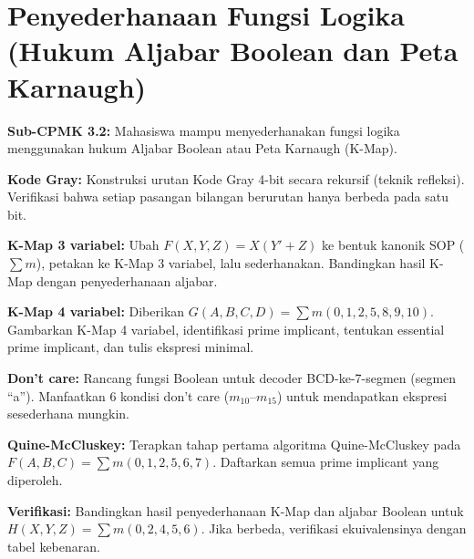 \documentclass[../main]{subfiles}
\begin{document}
\chapter{Penyederhanaan Fungsi Logika (Hukum Aljabar Boolean dan Peta Karnaugh)}

\begin{subcpmk}
  \item \textbf{Sub-CPMK 3.2:} Mahasiswa mampu menyederhanakan fungsi logika menggunakan hukum Aljabar Boolean atau Peta Karnaugh (K-Map).
\end{subcpmk}










\begin{aktivitas}
  \item \textbf{Kode Gray:} Konstruksi urutan Kode Gray 4-bit secara rekursif (teknik refleksi). Verifikasi bahwa setiap pasangan bilangan berurutan hanya berbeda pada satu bit.
  \item \textbf{K-Map 3 variabel:} Ubah $F(X,Y,Z) = X(Y' + Z)$ ke bentuk kanonik SOP ($\sum m$), petakan ke K-Map 3 variabel, lalu sederhanakan. Bandingkan hasil K-Map dengan penyederhanaan aljabar.
  \item \textbf{K-Map 4 variabel:} Diberikan $G(A,B,C,D) = \sum m(0, 1, 2, 5, 8, 9, 10)$. Gambarkan K-Map 4 variabel, identifikasi prime implicant, tentukan essential prime implicant, dan tulis ekspresi minimal.
  \item \textbf{Don't care:} Rancang fungsi Boolean untuk decoder BCD-ke-7-segmen (segmen ``a''). Manfaatkan 6 kondisi don't care ($m_{10}$--$m_{15}$) untuk mendapatkan ekspresi sesederhana mungkin.
  \item \textbf{Quine-McCluskey:} Terapkan tahap pertama algoritma Quine-McCluskey pada $F(A,B,C) = \sum m(0, 1, 2, 5, 6, 7)$. Daftarkan semua prime implicant yang diperoleh.
  \item \textbf{Verifikasi:} Bandingkan hasil penyederhanaan K-Map dan aljabar Boolean untuk $H(X,Y,Z) = \sum m(0, 2, 4, 5, 6)$. Jika berbeda, verifikasi ekuivalensinya dengan tabel kebenaran.
\end{aktivitas}
\end{document}
